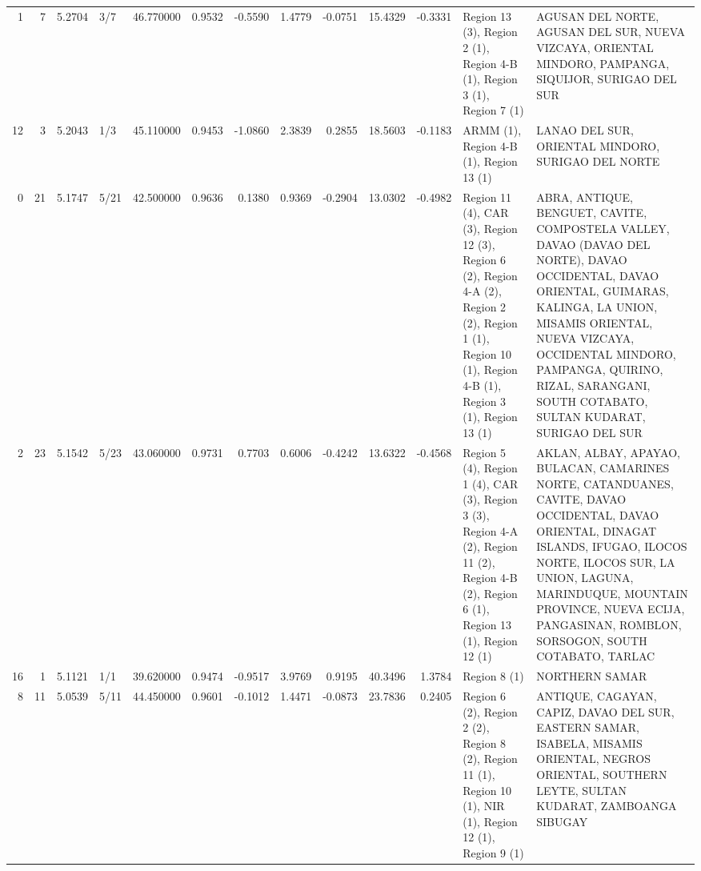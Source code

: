 \begin{tabular}{rrrlrrrrrrrll}
1 & 7 & {\cellcolor[HTML]{DDDCDC}} \color[HTML]{000000} 5.2704 & 3/7 & {\cellcolor[HTML]{EC8165}} \color[HTML]{F1F1F1} 46.770000 & 0.9532 & -0.5590 & 1.4779 & -0.0751 & 15.4329 & -0.3331 & Region 13 (3), Region 2 (1), Region 4-B (1), Region 3 (1), Region 7 (1) & AGUSAN DEL NORTE, AGUSAN DEL SUR, NUEVA VIZCAYA, ORIENTAL MINDORO, PAMPANGA, SIQUIJOR, SURIGAO DEL SUR \\
12 & 3 & {\cellcolor[HTML]{D4DBE6}} \color[HTML]{000000} 5.2043 & 1/3 & {\cellcolor[HTML]{F6A385}} \color[HTML]{000000} 45.110000 & 0.9453 & -1.0860 & 2.3839 & 0.2855 & 18.5603 & -0.1183 & ARMM (1), Region 4-B (1), Region 13 (1) & LANAO DEL SUR, ORIENTAL MINDORO, SURIGAO DEL NORTE \\
0 & 21 & {\cellcolor[HTML]{CFDAEA}} \color[HTML]{000000} 5.1747 & 5/21 & {\cellcolor[HTML]{F2CBB7}} \color[HTML]{000000} 42.500000 & 0.9636 & 0.1380 & 0.9369 & -0.2904 & 13.0302 & -0.4982 & Region 11 (4), CAR (3), Region 12 (3), Region 6 (2), Region 4-A (2), Region 2 (2), Region 1 (1), Region 10 (1), Region 4-B (1), Region 3 (1), Region 13 (1) & ABRA, ANTIQUE, BENGUET, CAVITE, COMPOSTELA VALLEY, DAVAO (DAVAO DEL NORTE), DAVAO OCCIDENTAL, DAVAO ORIENTAL, GUIMARAS, KALINGA, LA UNION, MISAMIS ORIENTAL, NUEVA VIZCAYA, OCCIDENTAL MINDORO, PAMPANGA, QUIRINO, RIZAL, SARANGANI, SOUTH COTABATO, SULTAN KUDARAT, SURIGAO DEL SUR \\
2 & 23 & {\cellcolor[HTML]{CCD9ED}} \color[HTML]{000000} 5.1542 & 5/23 & {\cellcolor[HTML]{F5C4AC}} \color[HTML]{000000} 43.060000 & 0.9731 & 0.7703 & 0.6006 & -0.4242 & 13.6322 & -0.4568 & Region 5 (4), Region 1 (4), CAR (3), Region 3 (3), Region 4-A (2), Region 11 (2), Region 4-B (2), Region 6 (1), Region 13 (1), Region 12 (1) & AKLAN, ALBAY, APAYAO, BULACAN, CAMARINES NORTE, CATANDUANES, CAVITE, DAVAO OCCIDENTAL, DAVAO ORIENTAL, DINAGAT ISLANDS, IFUGAO, ILOCOS NORTE, ILOCOS SUR, LA UNION, LAGUNA, MARINDUQUE, MOUNTAIN PROVINCE, NUEVA ECIJA, PANGASINAN, ROMBLON, SORSOGON, SOUTH COTABATO, TARLAC \\
16 & 1 & {\cellcolor[HTML]{C6D6F1}} \color[HTML]{000000} 5.1121 & 1/1 & {\cellcolor[HTML]{D3DBE7}} \color[HTML]{000000} 39.620000 & 0.9474 & -0.9517 & 3.9769 & 0.9195 & 40.3496 & 1.3784 & Region 8 (1) & NORTHERN SAMAR \\
8 & 11 & {\cellcolor[HTML]{BCD2F7}} \color[HTML]{000000} 5.0539 & 5/11 & {\cellcolor[HTML]{F7AF91}} \color[HTML]{000000} 44.450000 & 0.9601 & -0.1012 & 1.4471 & -0.0873 & 23.7836 & 0.2405 & Region 6 (2), Region 2 (2), Region 8 (2), Region 11 (1), Region 10 (1), NIR (1), Region 12 (1), Region 9 (1) & ANTIQUE, CAGAYAN, CAPIZ, DAVAO DEL SUR, EASTERN SAMAR, ISABELA, MISAMIS ORIENTAL, NEGROS ORIENTAL, SOUTHERN LEYTE, SULTAN KUDARAT, ZAMBOANGA SIBUGAY \\

\end{tabular}
